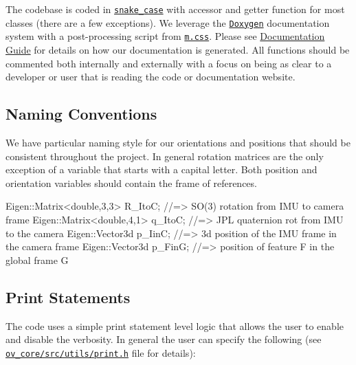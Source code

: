 The codebase is coded in \href{https://en.wikipedia.org/wiki/Snake_case}{\tt snake\+\_\+case} with accessor and getter function for most classes (there are a few exceptions). We leverage the \href{http://www.doxygen.nl/}{\tt Doxygen} documentation system with a post-\/processing script from \href{https://mcss.mosra.cz/documentation/doxygen/}{\tt m.\+css}. Please see \hyperlink{dev-docs}{Documentation Guide} for details on how our documentation is generated. All functions should be commented both internally and externally with a focus on being as clear to a developer or user that is reading the code or documentation website.\hypertarget{dev-coding-style_coding-style-naming}{}\subsection{Naming Conventions}\label{dev-coding-style_coding-style-naming}
We have particular naming style for our orientations and positions that should be consistent throughout the project. In general rotation matrices are the only exception of a variable that starts with a capital letter. Both position and orientation variables should contain the frame of references.


\begin{DoxyCode}
Eigen::Matrix<double,3,3> R\_ItoC; \textcolor{comment}{//=> SO(3) rotation from IMU to camera frame}
Eigen::Matrix<double,4,1> q\_ItoC; \textcolor{comment}{//=> JPL quaternion rot from IMU to the camera}
Eigen::Vector3d p\_IinC; \textcolor{comment}{//=> 3d position of the IMU frame in the camera frame}
Eigen::Vector3d p\_FinG; \textcolor{comment}{//=> position of feature F in the global frame G}
\end{DoxyCode}
\hypertarget{dev-coding-style_coding-style-printing}{}\subsection{Print Statements}\label{dev-coding-style_coding-style-printing}
The code uses a simple print statement level logic that allows the user to enable and disable the verbosity. In general the user can specify the following (see \href{ov_core/src/utils/print.h}{\tt ov\+\_\+core/src/utils/print.\+h} file for details)\+:


